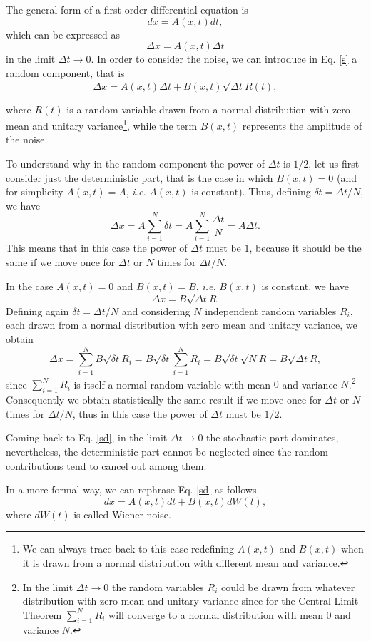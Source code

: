 
The general form of a first order differential equation is
\[
dx=A(x,t)dt,
\]
which can be expressed as 
\begin{equation}\label{s}
\Delta x=A(x,t)\Delta t
\end{equation}
in the limit $\Delta t \to 0$. In order to consider the noise, we can introduce in Eq. \eqref{s} a random component, that is
\begin{equation}\label{sd}
\Delta x=A(x,t)\Delta t+B(x,t)\sqrt{\Delta t}R(t),
\end{equation}

where $R(t)$ is a random variable drawn from a normal distribution with zero mean and unitary variance\footnote{We can always trace back to this case redefining $A(x,t)$ and $B(x,t)$ when it is drawn from a normal distribution with different mean and variance.}, while the term $B(x,t)$ represents the amplitude of the noise.

To understand why in the random component the power of $\Delta t$ is $1/2$, 
let us first consider just the deterministic part, that is the case in which $B(x,t)=0$ (and for simplicity $A(x,t)=A$, \emph{i.e.} $A(x,t)$ is constant). Thus, defining $\delta t = \Delta t/N$, we have
\[
\Delta x=A\sum_{i=1}^N\delta t=A\sum_{i=1}^N\frac{\Delta t}{N}=A\Delta t.
\]
This means that in this case the power of $\Delta t$ must be $1$, because it should be the same if we move once for $\Delta t$ or $N$ times for $\Delta t/N$.

In the case $A(x,t)=0$ and $B(x,t)=B$, \emph{i.e.} $B(x,t)$ is constant, we have
\[
\Delta x= B\sqrt{\Delta t}R.
\]
Defining again $\delta t = \Delta t/N$ and considering $N$ independent random variables $R_i$, each drawn from a normal distribution with zero mean and unitary variance, we obtain
\[
\Delta x= \sum_{i=1}^NB\sqrt{\delta t}R_i=B\sqrt{\delta t}\sum_{i=1}^NR_i=B\sqrt{\delta t}\sqrt{N}R=B\sqrt{\Delta t}R,
\]
since $\sum_{i=1}^NR_i$ is itself a normal random variable with mean $0$ and variance $N$.\footnote{In the limit $\Delta t \to 0$ the random variables $R_i$ could be drawn from whatever distribution with zero mean and unitary variance since for the Central Limit Theorem $\sum_{i=1}^NR_i$ will converge to a normal distribution with mean $0$ and variance $N$.} Consequently we obtain statistically the same result if we move once for $\Delta t$ or $N$ times for $\Delta t/N$, thus in this case the power of $\Delta t$ must be $1/2$.

Coming back to Eq. \eqref{sd}, in the limit $\Delta t \to 0$ the stochastic part dominates, nevertheless, the deterministic part cannot be neglected since the random contributions tend to cancel out among them.

In a more formal way, we can rephrase Eq. \eqref{sd} as follows.
\begin{equation}
dx=A(x,t)dt+B(x,t)dW(t),
\end{equation}
where $dW(t)$ is called Wiener noise. 